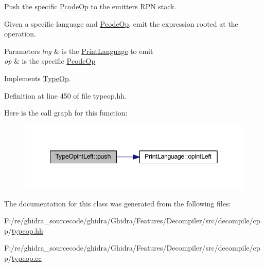 Push the specific \mbox{\hyperlink{class_pcode_op}{Pcode\+Op}} to the emitter\textquotesingle{}s R\+PN stack. 

Given a specific language and \mbox{\hyperlink{class_pcode_op}{Pcode\+Op}}, emit the expression rooted at the operation. 
\begin{DoxyParams}{Parameters}
{\em lng} & is the \mbox{\hyperlink{class_print_language}{Print\+Language}} to emit \\
\hline
{\em op} & is the specific \mbox{\hyperlink{class_pcode_op}{Pcode\+Op}} \\
\hline
\end{DoxyParams}


Implements \mbox{\hyperlink{class_type_op_ac9c9544203ed74dabe6ac662b653b2af}{Type\+Op}}.



Definition at line 450 of file typeop.\+hh.

Here is the call graph for this function\+:
\nopagebreak
\begin{figure}[H]
\begin{center}
\leavevmode
\includegraphics[width=342pt]{class_type_op_int_left_a4451bade27542ad853dbb21bb26f1191_cgraph}
\end{center}
\end{figure}


The documentation for this class was generated from the following files\+:\begin{DoxyCompactItemize}
\item 
F\+:/re/ghidra\+\_\+sourcecode/ghidra/\+Ghidra/\+Features/\+Decompiler/src/decompile/cpp/\mbox{\hyperlink{typeop_8hh}{typeop.\+hh}}\item 
F\+:/re/ghidra\+\_\+sourcecode/ghidra/\+Ghidra/\+Features/\+Decompiler/src/decompile/cpp/\mbox{\hyperlink{typeop_8cc}{typeop.\+cc}}\end{DoxyCompactItemize}
